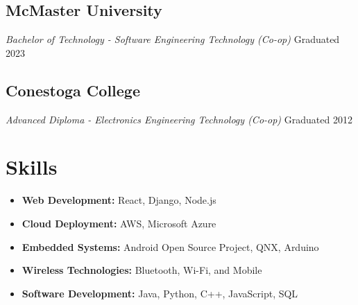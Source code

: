 \documentclass[a4paper,11pt]{article}  %
\begin{document}
\subsection*{McMaster University}
\textit{Bachelor of Technology - Software Engineering Technology (Co-op)} \hfill Graduated 2023

\subsection*{Conestoga College}
\textit{Advanced Diploma - Electronics Engineering Technology (Co-op)} \hfill Graduated 2012

\section{Skills}

\begin{itemize}
    \item \textbf{Web Development:} React, Django, Node.js
    \item \textbf{Cloud Deployment:} AWS, Microsoft Azure
    \item \textbf{Embedded Systems:} Android Open Source Project, QNX, Arduino
    \item \textbf{Wireless Technologies:} Bluetooth, Wi-Fi, and Mobile
    \item \textbf{Software Development:} Java, Python, C++, JavaScript, SQL
\end{itemize}
\end{document}
